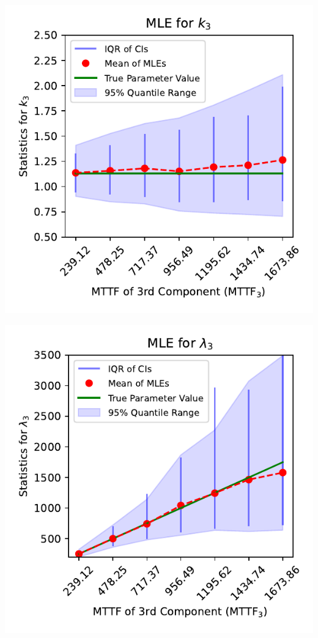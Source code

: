 \documentclass{article}
\begin{document}
\vspace{0.25mm}

\noindent
\begin{minipage}[t]{0.45\textwidth}
  \centering
  \includegraphics[width=\textwidth,height=0.33\textheight,keepaspectratio]{plot-mttf3-vs-shape.3.pdf}
\end{minipage}%
\hspace{0.05\textwidth} %
\begin{minipage}[t]{0.45\textwidth}
  \centering
  \includegraphics[width=\textwidth,height=0.33\textheight,keepaspectratio]{plot-mttf3-vs-scale.3.pdf}
\end{minipage}
\end{document}
